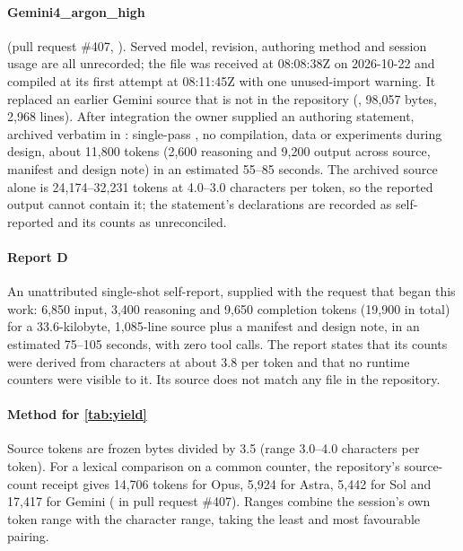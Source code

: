 \paragraph{Gemini4\_argon\_high} (pull request \#407,
). Served model, revision,
authoring method and session usage are all unrecorded; the file was received at 08:08:38Z on
2026-10-22 and compiled at its first attempt at 08:11:45Z with one unused-import warning. It replaced
an earlier Gemini source that is not in the repository (, 98,057 bytes,
2,968 lines). After integration the owner supplied an authoring statement, archived verbatim in
: single-pass , no
compilation, data or experiments during design, about 11,800 tokens (2,600 reasoning and 9,200
output across source, manifest and design note) in an estimated 55--85 seconds. The archived source
alone is 24,174--32,231 tokens at 4.0--3.0 characters per token, so the reported output cannot
contain it; the statement's declarations are recorded as self-reported and its counts as
unreconciled.

\paragraph{Report D} An unattributed single-shot self-report, supplied with the request that began
this work: 6,850 input, 3,400 reasoning and 9,650 completion tokens (19,900 in total) for a
33.6-kilobyte, 1,085-line source plus a manifest and design note, in an estimated 75--105 seconds,
with zero tool calls. The report states that its counts were derived from characters at about 3.8 per
token and that no runtime counters were visible to it. Its source does not match any file in the
repository.

\paragraph{Method for \cref{tab:yield}} Source tokens are frozen bytes divided by 3.5 (range 3.0--4.0
characters per token). For a lexical comparison on a common counter, the repository's source-count
receipt gives 14,706 tokens for Opus, 5,924 for Astra, 5,442 for Sol and 17,417 for Gemini
( in pull request \#407). Ranges combine the session's
own token range with the character range, taking the least and most favourable pairing.

